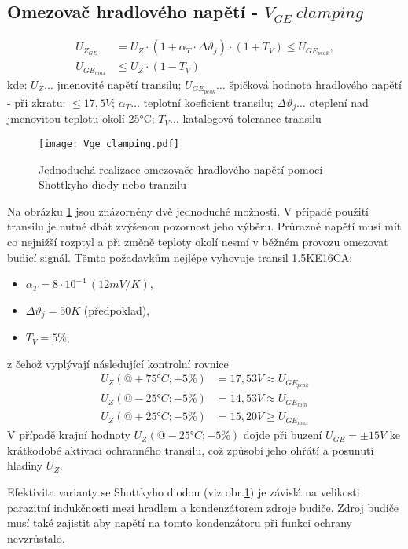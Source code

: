      \subsection{Omezovač hradlového napětí - $V_{GE}\ clamping$}\label{PVE:Vge_clamping}
     \begin{align}\label{PVE:eq_Vzge_tranzil}
       U_{Z_{GE}}   &=    U_Z\cdot(1+\alpha_T\cdot\Delta\vartheta_j)\cdot(1+T_V)\leq
                          U_{GE_{peak}},                                                         \\
       U_{GE_{max}} &\leq U_Z\cdot(1-T_V)
     \end{align}
     kde: $U_Z\ldots$ jmenovité napětí transilu; $U_{GE_{peak}}\ldots$ špičková hodnota hradlového napě\-tí - při zkratu: $\leq17,5V$; $
     \alpha_T\ldots$ teplotní koeficient transilu; $\Delta\vartheta_j\ldots$ oteplení nad jmenovitou teplotu okolí 25°C; $T_V\ldots$ katalogová tolerance transilu

       \begin{figure}[ht!]
         \centering
         \texttt{[image: Vge\_clamping.pdf]}
         \caption[Omezovač hradlového napětí]{Jednoduchá realizace omezovače hradlového napětí pomocí Shottkyho diody nebo tranzilu}\label{VE:fig_Vge_clamp}
       \end{figure}

     Na obrázku \ref{VE:fig_Vge_clamp} jsou znázorněny dvě jednoduché možnosti. V případě použití
     transilu je nutné dbát zvýšenou pozornost jeho výběru. Průrazné napětí musí mít co nejnižší
     rozptyl a při změně teploty okolí nesmí v běžném provozu omezovat budicí signál. Těmto
     požadavkům nejlépe vyhovuje transil 1.5KE16CA:
      \begin{itemize}
        \item $\alpha_T = 8\cdot10^{-4}\ (12mV/K)$,
        \item $\Delta\vartheta_j = 50K$ (předpoklad),
        \item $T_V = 5\%$,
      \end{itemize}
     z čehož vyplývají následující kontrolní rovnice
      \begin{align}
        U_Z(@+75°C; +5\%) &= 17,53V\approx U_{GE_{peak}}\\
        U_Z(@-25°C; -5\%) &= 14,53V\approx U_{GE_{min}} \\
        U_Z(@+25°C; -5\%) &= 15,20V\geq U_{GE_{max}}
      \end{align}
     V případě krajní hodnoty $U_Z(@-25°C; -5\%)$ dojde při buzení $U_{GE}=\pm15V$ ke krátkodobé
     aktivaci ochranného transilu, což způsobí jeho ohřátí a posunutí hladiny $U_Z$.

     Efektivita varianty se Shottkyho diodou (viz obr.\ref{VE:fig_Vge_clamp}) je závislá na velikosti parazitní indukčnosti 
     mezi hradlem a kondenzátorem zdroje budiče. Zdroj budiče musí také zajistit aby napětí na tomto kondenzátoru při funkci 
     ochrany nevzrůstalo.    